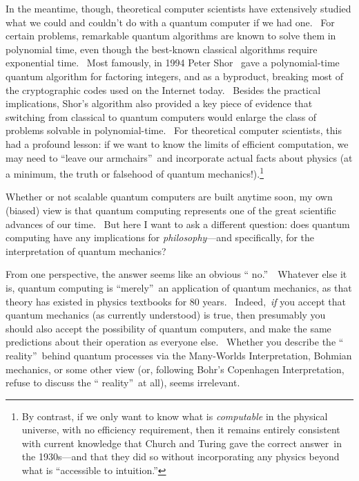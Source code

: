 \documentclass[11pt,onecolumn]{article}%
\begin{document}
In the meantime, though, theoretical computer scientists have extensively
studied what we could and couldn't do with a quantum computer if we had one.
\ For certain problems, remarkable quantum algorithms are known to solve them
in polynomial time, even though the best-known classical algorithms require
exponential time. \ Most famously, in 1994 Peter Shor \cite{shor}\ gave a
polynomial-time quantum algorithm for factoring integers, and as a byproduct,
breaking most of the cryptographic codes used on the Internet today. \ Besides
the practical implications, Shor's algorithm also provided a key piece of
evidence that switching from classical to quantum computers would enlarge the
class of problems solvable in polynomial-time. \ For theoretical computer
scientists, this had a profound lesson: if we want to know the limits of
efficient computation, we may need to \textquotedblleft leave our
armchairs\textquotedblright\ and incorporate actual facts about physics (at a
minimum, the truth or falsehood of quantum mechanics!).\footnote{By contrast,
if we only want to know what is \textit{computable} in the physical universe,
with no efficiency requirement, then it remains entirely consistent with
current knowledge that Church and Turing gave the correct answer\ in the
1930s---and that they did so without incorporating any physics beyond what is
\textquotedblleft accessible to intuition.\textquotedblright}

Whether or not scalable quantum computers are built anytime soon, my own
(biased) view is that quantum computing represents one of the great scientific
advances of our time. \ But here I want to ask a different question: does
quantum computing have any implications for \textit{philosophy}---and
specifically, for the interpretation of quantum mechanics?

From one perspective, the answer seems like an obvious \textquotedblleft
no.\textquotedblright\ \ Whatever else it is, quantum computing is
\textquotedblleft merely\textquotedblright\ an application of quantum
mechanics, as that theory has existed in physics textbooks for 80 years.
\ Indeed,\ \textit{if} you accept that quantum mechanics (as currently
understood) is true, then presumably you should also accept the possibility of
quantum computers, and make the same predictions about their operation as
everyone else. \ Whether you describe the \textquotedblleft
reality\textquotedblright\ behind quantum processes via the Many-Worlds
Interpretation, Bohmian mechanics, or some other view (or, following Bohr's
Copenhagen Interpretation, refuse to discuss the \textquotedblleft
reality\textquotedblright\ at all), seems irrelevant.
\end{document}
